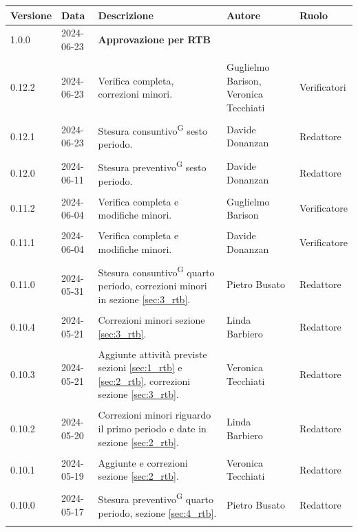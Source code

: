 \documentclass[8pt]{article}
\newcommand{\glossterm}[1]{#1\textsuperscript{G}} %
\begin{document}
\begin{table}[ht!]	
\hypersetup{hidelinks}
	\centering
	\begin{tabular}{p{1.2cm} p{2cm} p{6cm} p{3cm} p{2cm}}
		\toprule
		\textbf{Versione}& \textbf{Data} & \textbf{Descrizione} & \textbf{Autore} & \textbf{Ruolo} \\
		\midrule 
		1.0.0 & 2024-06-23 & \textbf{Approvazione per RTB} & & \\\\	
    0.12.2 & 2024-06-23 & Verifica completa, correzioni minori. & Guglielmo Barison, Veronica
      Tecchiati & Verificatori  \\\\
    0.12.1 & 2024-06-23 & Stesura \glossterm{consuntivo} sesto periodo. & Davide Donanzan & Redattore \\\\
		0.12.0 & 2024-06-11 & Stesura \glossterm{preventivo} sesto periodo. & Davide Donanzan & Redattore \\\\
		0.11.2 & 2024-06-04 & Verifica completa e modifiche minori. & Guglielmo Barison & Verificatore \\\\
		0.11.1 & 2024-06-04 & Verifica completa e modifiche minori. & Davide Donanzan & Verificatore \\\\
		0.11.0 & 2024-05-31 & Stesura \glossterm{consuntivo} quarto periodo, correzioni minori in sezione \ref{sec:3_rtb}. & Pietro Busato & Redattore \\\\
        0.10.4 & 2024-05-21 & Correzioni minori sezione \ref{sec:3_rtb}. & Linda Barbiero & Redattore \\\\
		0.10.3 & 2024-05-21 & Aggiunte attività previste sezioni \ref{sec:1_rtb} e \ref{sec:2_rtb}, correzioni sezione \ref{sec:3_rtb}. & Veronica Tecchiati & Redattore \\\\
        0.10.2 & 2024-05-20 & Correzioni minori riguardo il primo periodo e date in sezione \ref{sec:2_rtb}. & Linda Barbiero & Redattore \\\\
		0.10.1 & 2024-05-19 & Aggiunte e correzioni sezione \ref{sec:2_rtb}. & Veronica Tecchiati & Redattore \\\\
        0.10.0 & 2024-05-17 & Stesura \glossterm{preventivo} quarto periodo, sezione \ref{sec:4_rtb}. & Pietro Busato & Redattore \\\\

\end{tabular}
\end{table}
\end{document}
